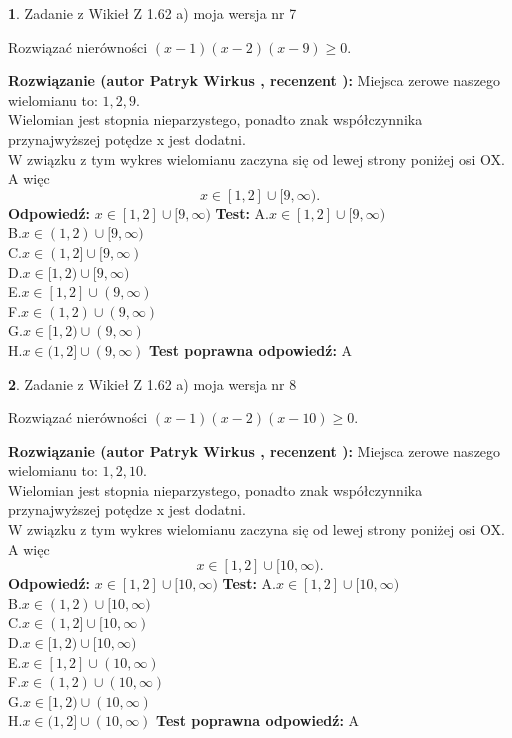 \documentclass[12pt, a4paper]{article}
\theoremstyle{definition} %
\newtheorem{zad}{}
\newcommand{\zadStart}[1]{\begin{zad}#1\newline}
\newcommand{\zadStop}{\end{zad}}
\newcommand{\rozwStart}[2]{\noindent \textbf{Rozwiązanie (autor #1 , recenzent #2): }\newline}
\newcommand{\rozwStop}{\newline}
\newcommand{\odpStart}{\noindent \textbf{Odpowiedź:}\newline}
\newcommand{\odpStop}{\newline}
\newcommand{\testStart}{\noindent \textbf{Test:}\newline}
\newcommand{\testStop}{\newline}
\newcommand{\kluczStart}{\noindent \textbf{Test poprawna odpowiedź:}\newline}
\newcommand{\kluczStop}{\newline}
\begin{document}
\zadStart{Zadanie z Wikieł Z 1.62 a) moja wersja nr 7}

Rozwiązać nierówności $(x-1)(x-2)(x-9)\ge0$.
\zadStop
\rozwStart{Patryk Wirkus}{}
Miejsca zerowe naszego wielomianu to: $1, 2, 9$.\\
Wielomian jest stopnia nieparzystego, ponadto znak współczynnika przy\linebreak najwyższej potędze x jest dodatni.\\ W związku z tym wykres wielomianu zaczyna się od lewej strony poniżej osi OX. A więc $$x \in [1,2] \cup [9,\infty).$$
\rozwStop
\odpStart
$x \in [1,2] \cup [9,\infty)$
\odpStop
\testStart
A.$x \in [1,2] \cup [9,\infty)$\\
B.$x \in (1,2) \cup [9,\infty)$\\
C.$x \in (1,2] \cup [9,\infty)$\\
D.$x \in [1,2) \cup [9,\infty)$\\
E.$x \in [1,2] \cup (9,\infty)$\\
F.$x \in (1,2) \cup (9,\infty)$\\
G.$x \in [1,2) \cup (9,\infty)$\\
H.$x \in (1,2] \cup (9,\infty)$
\testStop
\kluczStart
A
\kluczStop



\zadStart{Zadanie z Wikieł Z 1.62 a) moja wersja nr 8}

Rozwiązać nierówności $(x-1)(x-2)(x-10)\ge0$.
\zadStop
\rozwStart{Patryk Wirkus}{}
Miejsca zerowe naszego wielomianu to: $1, 2, 10$.\\
Wielomian jest stopnia nieparzystego, ponadto znak współczynnika przy\linebreak najwyższej potędze x jest dodatni.\\ W związku z tym wykres wielomianu zaczyna się od lewej strony poniżej osi OX. A więc $$x \in [1,2] \cup [10,\infty).$$
\rozwStop
\odpStart
$x \in [1,2] \cup [10,\infty)$
\odpStop
\testStart
A.$x \in [1,2] \cup [10,\infty)$\\
B.$x \in (1,2) \cup [10,\infty)$\\
C.$x \in (1,2] \cup [10,\infty)$\\
D.$x \in [1,2) \cup [10,\infty)$\\
E.$x \in [1,2] \cup (10,\infty)$\\
F.$x \in (1,2) \cup (10,\infty)$\\
G.$x \in [1,2) \cup (10,\infty)$\\
H.$x \in (1,2] \cup (10,\infty)$
\testStop
\kluczStart
A
\kluczStop
\end{document}
